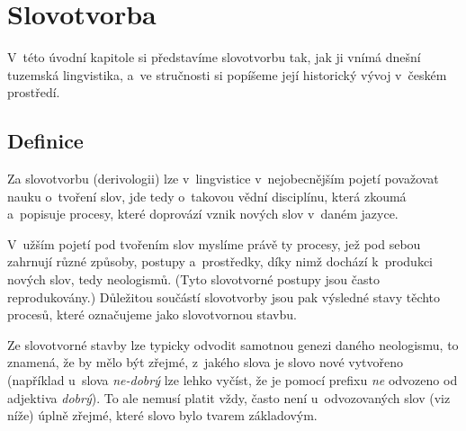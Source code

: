 \hypertarget{slovotvorba}{%
\chapter{Slovotvorba}\label{slovotvorba}}

V~této úvodní kapitole si představíme slovotvorbu tak, jak ji vnímá
dnešní tuzemská lingvistika, a~ve stručnosti si popíšeme její historický
vývoj v~českém prostředí.

\hypertarget{definice}{%
\section{Definice}\label{definice}}

Za slovotvorbu (derivologii) lze v~lingvistice v~nejobecnějším pojetí
považovat nauku o~tvoření slov, jde tedy o~takovou vědní disciplínu,
která zkoumá a~popisuje procesy, které doprovází vznik nových slov
v~daném jazyce.

V~užším pojetí pod tvořením slov myslíme právě ty procesy, jež pod sebou
zahrnují různé způsoby, postupy a~prostředky, díky nimž dochází
k~produkci nových slov, tedy neologismů. (Tyto slovotvorné postupy jsou
často reprodukovány.) Důležitou součástí slovotvorby jsou pak výsledné
stavy těchto procesů, které označujeme jako slovotvornou stavbu.

Ze slovotvorné stavby lze typicky odvodit samotnou genezi daného
neologismu, to znamená, že by mělo být zřejmé, z~jakého slova je slovo
nové vytvořeno (například u~slova \emph{ne-dobrý} lze lehko vyčíst, že
je pomocí prefixu \emph{ne} odvozeno od adjektiva \emph{dobrý}). To ale
nemusí platit vždy, často není u~odvozovaných slov (viz níže) úplně
zřejmé, které slovo bylo tvarem základovým.
